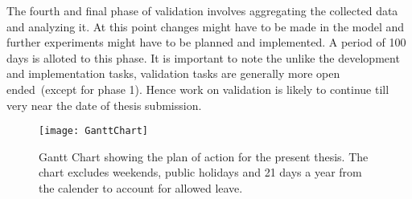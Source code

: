 The fourth and final phase of validation involves aggregating the collected data and analyzing it. At this point changes might have to be made in the model and further experiments might have to be planned and implemented. A period of 100 days is alloted to this phase. It is important to note the unlike the development and implementation tasks, validation tasks are generally more open ended~(except for phase 1). Hence work on validation is likely to continue till very near the date of thesis submission.


\begin{sidewaysfigure}[!tb]
\centering
\texttt{[image: GanttChart]}
\caption[Planned Schedule]{Gantt Chart showing the plan of action for the present thesis. The chart excludes weekends, public holidays and 21 days a year from the calender to account for allowed leave.}
\label{fig:GanttChart}
\end{sidewaysfigure}

